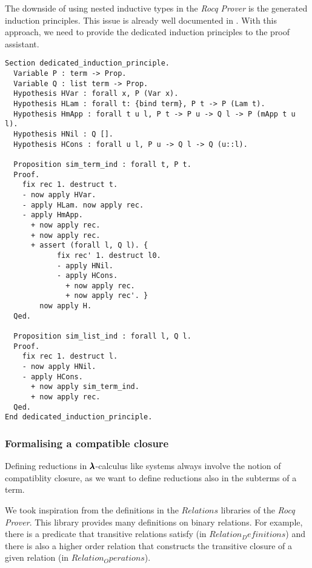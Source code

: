 
The downside of using nested inductive types in the \textit{Rocq Prover} is the generated induction principles.
This issue is already well documented in \cite[Chapter~14.3]{CoqArt}.
With this approach, we need to provide the dedicated induction principles to the proof assistant.

\begin{lstlisting}[language=Coq]
Section dedicated_induction_principle.
  Variable P : term -> Prop.
  Variable Q : list term -> Prop.
  Hypothesis HVar : forall x, P (Var x).
  Hypothesis HLam : forall t: {bind term}, P t -> P (Lam t).
  Hypothesis HmApp : forall t u l, P t -> P u -> Q l -> P (mApp t u l).
  Hypothesis HNil : Q [].
  Hypothesis HCons : forall u l, P u -> Q l -> Q (u::l).
  
  Proposition sim_term_ind : forall t, P t.
  Proof.
    fix rec 1. destruct t.
    - now apply HVar.
    - apply HLam. now apply rec.
    - apply HmApp.
      + now apply rec.
      + now apply rec.
      + assert (forall l, Q l). {
            fix rec' 1. destruct l0.
            - apply HNil.
            - apply HCons.
              + now apply rec.
              + now apply rec'. }          
        now apply H.
  Qed.      
  
  Proposition sim_list_ind : forall l, Q l.
  Proof.
    fix rec 1. destruct l.
    - now apply HNil.
    - apply HCons.
      + now apply sim_term_ind.
      + now apply rec.
  Qed.          
End dedicated_induction_principle.
\end{lstlisting}

\subsubsection{Formalising a compatible closure}

Defining reductions in $\pmb{\lambda}$-calculus like systems always involve the notion of compatiblity closure, as we want to define reductions also in the subterms of a term.

We took inspiration from the definitions in the \lst$Relations$ libraries of the \textit{Rocq Prover}.
This library provides many definitions on binary relations.
For example, there is a predicate that transitive relations satisfy (in \lst$Relation_Definitions$) and there is also a higher order relation that constructs the transitive closure of a given relation (in \lst$Relation_Operations$).

